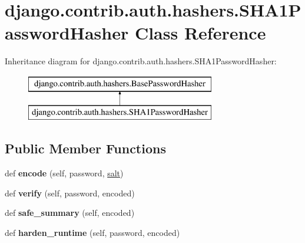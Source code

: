 \hypertarget{classdjango_1_1contrib_1_1auth_1_1hashers_1_1_s_h_a1_password_hasher}{}\section{django.\+contrib.\+auth.\+hashers.\+S\+H\+A1\+Password\+Hasher Class Reference}
\label{classdjango_1_1contrib_1_1auth_1_1hashers_1_1_s_h_a1_password_hasher}
Inheritance diagram for django.\+contrib.\+auth.\+hashers.\+S\+H\+A1\+Password\+Hasher\+:\begin{figure}[H]
\begin{center}
\leavevmode
\includegraphics[height=2.000000cm]{classdjango_1_1contrib_1_1auth_1_1hashers_1_1_s_h_a1_password_hasher}
\end{center}
\end{figure}
\subsection*{Public Member Functions}
\begin{DoxyCompactItemize}
\item 
\mbox{\label{classdjango_1_1contrib_1_1auth_1_1hashers_1_1_s_h_a1_password_hasher_a0d0ece50a494f811ac27734923128e1f}} 
def {\bfseries encode} (self, password, \mbox{\hyperlink{classdjango_1_1contrib_1_1auth_1_1hashers_1_1_base_password_hasher_a6761698d81d6070e4aa046fe6b7116f7}{salt}})
\item 
\mbox{\label{classdjango_1_1contrib_1_1auth_1_1hashers_1_1_s_h_a1_password_hasher_a5a7efce9647022ac7210aaca2920c328}} 
def {\bfseries verify} (self, password, encoded)
\item 
\mbox{\label{classdjango_1_1contrib_1_1auth_1_1hashers_1_1_s_h_a1_password_hasher_af868450ef1ad331758128a90dc5b48ec}} 
def {\bfseries safe\+\_\+summary} (self, encoded)
\item 
\mbox{\label{classdjango_1_1contrib_1_1auth_1_1hashers_1_1_s_h_a1_password_hasher_a423e34eafd459f912b73891bbdc9a217}} 
def {\bfseries harden\+\_\+runtime} (self, password, encoded)
\end{DoxyCompactItemize}
